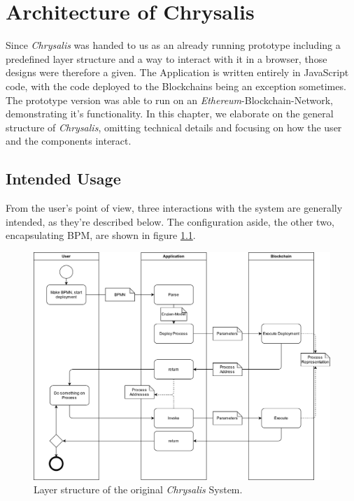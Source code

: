 %
\chapter{Architecture of Chrysalis}
\label{sec:init}

Since \emph{Chrysalis} was handed to us as an already running prototype including a predefined layer structure and a way to interact with it in a browser, those designs were therefore a given. The Application is written entirely in JavaScript code, with the code deployed to the Blockchains being an exception sometimes.
The prototype version was able to run on an \emph{Ethereum}-Blockchain-Network, demonstrating it's functionality.
In this chapter, we elaborate on the general structure of \emph{Chrysalis}, omitting technical details and focusing on how the user and the components interact.

\section{Intended Usage}
\label{sec:init:usage}

From the user's point of view, three interactions with the system are generally intended, as they're described below. The configuration aside, the other two, encapsulating BPM, are shown in figure \ref{fig:init:usage:bpm}.

\begin{figure}[h]
	\centering
	\captionsetup{justification=centering,margin=2cm}
	\includegraphics[height=0.7\textwidth]{gfx/bpmn2bc}
	\caption{Layer structure of the original \emph{Chrysalis} System.}
	\label{fig:init:usage:bpm}
\end{figure}


